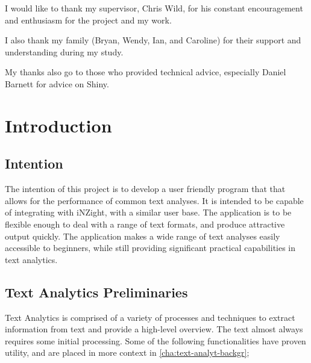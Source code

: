 \documentclass[11pt, a4paper, titlepage]{report}
\begin{document}
I would like to thank my supervisor, Chris Wild, for his constant
encouragement and enthusiasm for the project and my work.

I also thank my family (Bryan, Wendy, Ian, and Caroline) for their
support and understanding during my study.

My thanks also go to those who provided technical advice, especially
Daniel Barnett for advice on Shiny.



\tableofcontents
{}
\listoflistings{}  \listoftables
{} \listoffigures

\chapter{Introduction}\label{cha:introduction}
\setcounter{page}{1} 
\section{Intention}\label{sec:intention}

The intention of this project is to develop a user friendly program
that that allows for the performance of common text analyses. It is
intended to be capable of integrating with iNZight, with a similar
user base. The application is to be flexible enough to deal with a
range of text formats, and produce attractive output quickly. The
application makes a wide range of text analyses easily accessible to
beginners, while still providing significant practical capabilities in
text analytics.
  
\section{Text Analytics Preliminaries}\label{sec:backgr-text-analyt}

Text Analytics is comprised of a variety of processes and techniques
to extract information from text and provide a high-level overview.
The text almost always requires some initial processing. Some of the
following functionalities have proven utility, and are placed in more
context in \underline{\cref{cha:text-analyt-backgr}};
\end{document}
